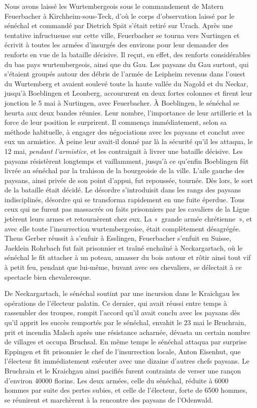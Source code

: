 \documentclass[french,twoside]{book} %
\begin{document}
Nous avons laissé les Wurtembergeois sous le commandement de Matern Feuerbacher à Kirchheim-sous-Teck, d’où le corps d’observation laissé par le sénéchal et commandé par Dietrich Spät s’était retiré sur Urach. Après une tentative infructueuse sur cette ville, Feuerbacher se tourna vers Nurtingen et écrivit à toutes les armées d’insurgés des environs pour leur demander des renforts en vue de la bataille décisive. Il reçut, en effet, des renforts considérables du bas pays wurtembergeois, ainsi que du Gau. Les paysans du Gau surtout, qui s’étaient groupés autour des débris de l’armée de Leipheim revenus dans l’ouest du Wurtemberg et avaient soulevé toute la haute vallée du Nagold et du Neckar, jusqu’à Boeblingen et Leonberg, accoururent en deux fortes colonnes et firent leur jonction le 5 mai à Nurtingen, avec Feuerbacher. À Boeblingen, le sénéchal se heurta aux deux bandes réunies. Leur nombre, l’importance de leur artillerie et la force de leur position le surprirent. Il commença immédiatement, selon sa méthode habituelle, à engager des négociations avec les paysans et conclut avec eux un armistice. À peine leur avait-il donné par là la sécurité qu’il les attaqua, le 12 mai, \emph{pendant l’armistice}, et les contraignit à livrer une bataille décisive. Les paysans résistèrent longtemps et vaillamment, jusqu’à ce qu’enfin Boeblingen fût livrée au sénéchal par la trahison de la bourgeoisie de la ville. L’aile gauche des paysans, ainsi privée de son point d’appui, fut repoussée, tournée. Dès lors, le sort de la bataille était décidé. Le désordre s’introduisit dans les rangs des paysans indisciplinés, désordre qui se transforma rapidement en une fuite éperdue. Tous ceux qui ne furent pas massacrés ou faits prisonniers par les cavaliers de la Ligue jetèrent leurs armes et retournèrent chez eux. La « grande armée chrétienne », et avec elle toute l’insurrection wurtembergeoise, était complètement désagrégée. Theus Gerber réussit à s’enfuir à Esslingen, Feuerbacher s’enfuit en Suisse, Jaeklein Rohrbach fut fait prisonnier et traîné enchaîné à Neckargartach, où le sénéchal le fit attacher à un poteau, amasser du bois autour et rôtir ainsi tout vif à petit feu, pendant que lui-même, buvant avec ses chevaliers, se délectait à ce spectacle bien chevaleresque.\par
De Neckargartach, le sénéchal soutint par une incursion dans le Kraichgau les opérations de l’électeur palatin. Ce dernier, qui avait réussi entre temps à rassembler des troupes, rompit l’accord qu’il avait conclu avec les paysans dès qu’il apprit les succès remportés par le sénéchal, envahit le 23 mai le Bruchrain, prit et incendia Malsch après une résistance acharnée, dévasta un certain nombre de villages et occupa Bruchsal. En même temps le sénéchal attaqua par surprise Eppingen et fit prisonnier le chef de l’insurrection locale, Anton Eisenhut, que l’électeur fit immédiatement exécuter avec une dizaine d’autres chefs paysans. Le Bruchrain et le Kraichgau ainsi pacifiés furent contraints de verser une rançon d’environ 40000 florins. Les deux armées, celle du sénéchal, réduite à 6000 hommes par suite des pertes subies, et celle de l’électeur, forte de 6500 hommes, se réunirent et marchèrent à la rencontre des paysans de l’Odenwald.\par
\end{document}
